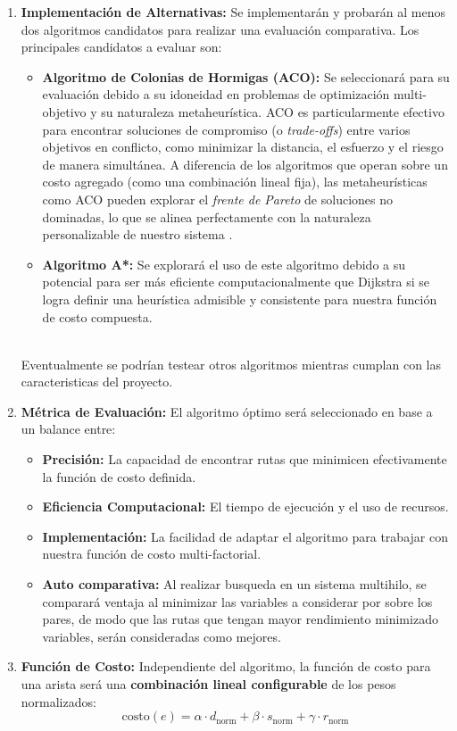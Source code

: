 \documentclass[12pt, a4paper, spanish]{article}
\begin{document}
\begin{enumerate}
    \item \textbf{Implementación de Alternativas:} Se implementarán y probarán al menos dos algoritmos candidatos para realizar una evaluación comparativa. Los principales candidatos a evaluar son:
    \begin{itemize}
        \item \textbf{Algoritmo de Colonias de Hormigas (ACO):} Se seleccionará para su evaluación debido a su idoneidad en problemas de optimización multi-objetivo y su naturaleza metaheurística. ACO es particularmente efectivo para encontrar soluciones de compromiso (o \emph{trade-offs}) entre varios objetivos en conflicto, como minimizar la distancia, el esfuerzo y el riesgo de manera simultánea. A diferencia de los algoritmos que operan sobre un costo agregado (como una combinación lineal fija), las metaheurísticas como ACO pueden explorar el \emph{frente de Pareto} de soluciones no dominadas, lo que se alinea perfectamente con la naturaleza personalizable de nuestro sistema \cite{dorigo2006}.
        \item \textbf{Algoritmo A*:} Se explorará el uso de este algoritmo debido a su potencial para ser más eficiente computacionalmente que Dijkstra si se logra definir una heurística admisible y consistente para nuestra función de costo compuesta.
    \end{itemize}\\

    Eventualmente se podrían testear otros algoritmos mientras cumplan con las caracteristicas del proyecto.
    
    \item \textbf{Métrica de Evaluación:} El algoritmo óptimo será seleccionado en base a un balance entre:
    \begin{itemize}
        \item \textbf{Precisión:} La capacidad de encontrar rutas que minimicen efectivamente la función de costo definida.
        \item \textbf{Eficiencia Computacional:} El tiempo de ejecución y el uso de recursos.
        \item \textbf{Implementación:} La facilidad de adaptar el algoritmo para trabajar con nuestra función de costo multi-factorial.
        \item \textbf{Auto comparativa:} Al realizar busqueda en un sistema multihilo, se comparará ventaja al minimizar las variables a considerar por sobre los pares, de modo que las rutas que tengan mayor rendimiento minimizado variables, serán consideradas como mejores.
    \end{itemize}
    
    \item \textbf{Función de Costo:} Independiente del algoritmo, la función de costo para una arista será una \textbf{combinación lineal configurable} de los pesos normalizados:
    \[
    \text{costo}(e) = \alpha \cdot d_{\text{norm}} + \beta \cdot s_{\text{norm}} + \gamma \cdot r_{\text{norm}}
    \]
    
\end{enumerate}
\end{document}
